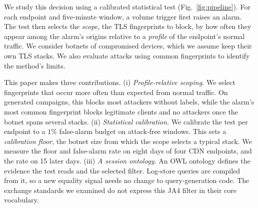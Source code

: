 \documentclass[conference,letterpaper,10pt]{IEEEtran}
\newcommand\1{\textit{(i)}}
\newcommand\2{\textit{(ii)}}
\newcommand\3{\textit{(iii)}}
\newcommand\4{\textit{(iv)}}
\newcommand\5{\textit{(v)}}
\newcommand\6{\textit{(vi)}}
\newcommand\7{\textit{(vii)}}
\newcommand\8{\textit{(viii)}}
\newcommand\9{\textit{(ix)}}
\begin{document}
We study this decision using a calibrated statistical
test (Fig.~\ref{fig:pipeline}). For each endpoint and
five-minute window, a volume trigger first raises an alarm.
The test then selects the \textit{scope}, the TLS
fingerprints to block, by how often they appear among the
alarm's origins relative to a \textit{profile} of the
endpoint's normal traffic.
We consider botnets of compromised devices, which we assume
keep their own TLS stacks. We also
evaluate attacks using common fingerprints to identify
the method's limits.

This paper makes three contributions. (i) \emph{Profile-relative
scoping.} We select fingerprints that occur more often
than expected from normal traffic. On generated campaigns,
this blocks most attackers without labels, while the alarm's
most common fingerprint blocks legitimate clients and no
attackers once the botnet spans several stacks. (ii)
\emph{Statistical calibration.}
We calibrate the test per endpoint to a $1\%$ false-alarm
budget on attack-free windows. This sets a
\textit{calibration floor}, the botnet size from which the
scope selects a typical stack. We measure the floor and
false-alarm rate on eight days of four CDN endpoints, and
the rate on 15 later days. (iii) \emph{A session
ontology.} An OWL ontology defines the evidence the test
reads and the selected filter. Log-store queries are
compiled from it, so a new equality signal needs no change
to query-generation code. The exchange standards we examined
do not express
this JA4 filter in their core vocabulary.
\end{document}
